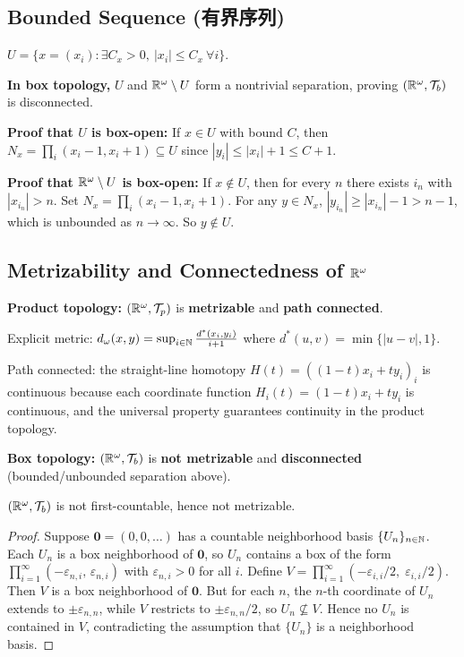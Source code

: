 \documentclass{article}
\begin{document}
\subsection{Bounded Sequence (有界序列)}\label{def:bounded-seq}
$U = \{x = (x_i) : \exists C_x > 0,\ |x_i| \le C_x\ \forall i\}$.

\textbf{In box topology,} $U$ and $\mathbb{R}^\omega \setminus U$ form a
nontrivial separation, proving $(\mathbb{R}^\omega, \mathcal{T}_b)$ is
disconnected.

\textbf{Proof that $U$ is box-open:} If $x \in U$ with bound $C$,
then $N_x = \prod_i (x_i - 1, x_i + 1) \subseteq U$ since $|y_i| \le
|x_i| + 1 \le C + 1$.

\textbf{Proof that $\mathbb{R}^\omega \setminus U$ is box-open:} If $x
\notin U$, then for every $n$ there exists $i_n$ with $|x_{i_n}| > n$.
Set $N_x = \prod_i (x_i - 1, x_i + 1)$. For any $y \in N_x$,
$|y_{i_n}| \ge |x_{i_n}| - 1 > n - 1$, which is unbounded as $n \to
\infty$. So $y \notin U$.

\subsection{Metrizability and Connectedness of $\mathbb{R}^\omega$}

\textbf{Product topology:} $(\mathbb{R}^\omega, \mathcal{T}_p)$ is
\textbf{metrizable} and \textbf{path connected}.

Explicit metric: $d_\omega(x,y) = \sup_{i \in \mathbb{N}}
\frac{d^*(x_i, y_i)}{i+1}$ where $d^*(u,v) = \min\{|u-v|, 1\}$.

Path connected: the straight-line homotopy $H(t) = ((1-t)x_i + ty_i)_i$
is continuous because each coordinate function $H_i(t) = (1-t)x_i +
ty_i$ is continuous, and the universal property guarantees continuity
in the product topology.

\textbf{Box topology:} $(\mathbb{R}^\omega, \mathcal{T}_b)$ is
\textbf{not metrizable} and \textbf{disconnected} (bounded/unbounded
separation above).

\begin{proposition}
  $(\mathbb{R}^\omega, \mathcal{T}_b)$ is not first-countable, hence not metrizable.
\end{proposition}
\begin{proof}
  Suppose $\mathbf{0} = (0,0,\ldots)$ has a countable neighborhood basis
  $\{U_n\}_{n \in \mathbb{N}}$. Each $U_n$ is a box neighborhood of $\mathbf{0}$,
  so $U_n$ contains a box of the form $\prod_{i=1}^\infty (-\varepsilon_{n,i},\,
  \varepsilon_{n,i})$ with $\varepsilon_{n,i} > 0$ for all $i$.
  Define $V = \prod_{i=1}^\infty (-\varepsilon_{i,i}/2,\; \varepsilon_{i,i}/2)$.
  Then $V$ is a box neighborhood of $\mathbf{0}$.
  But for each $n$, the $n$-th coordinate of $U_n$ extends to
  $\pm\varepsilon_{n,n}$,
  while $V$ restricts to $\pm\varepsilon_{n,n}/2$, so $U_n \not\subseteq V$.
  Hence no $U_n$ is contained in $V$, contradicting the assumption that
  $\{U_n\}$ is a neighborhood basis.
\end{proof}
\end{document}
